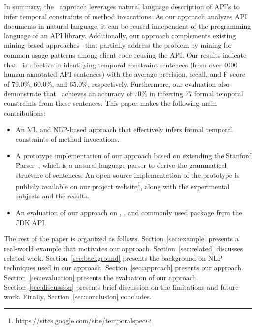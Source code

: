 In summary, the \tool\ approach leverages natural language description of API's to infer temporal constraints of method invocations.
As our approach analyzes API documents in natural language, it can be reused independent of the programming language of an API library.
Additionally, our approach complements existing mining-based approaches~\cite{buse2012synthesizing, thummalapenta07parseweb, Wang:2013:MSR, Zhong:2009:MMR} that partially address the problem by mining for common usage patterns among client code reusing the API.
Our results indicate that \tool\ is effective in identifying temporal
constraint sentences (from over
4000 human-annotated API sentences) with the average precision, recall, and F-score
of 79.0\%, 60.0\%, and 65.0\%, respectively.
Furthermore, our evaluation also demonstrate that \tool\ achieves an accuracy of 70\% in inferring 77 formal temporal constraints from these sentences.
This paper makes the following main contributions:


\begin{itemize}
	\item An ML and NLP-based approach that effectively infers formal temporal constraints of method invocations. 
	\item A prototype implementation of our approach based on extending the Stanford Parser~\cite{Klein03}, which is a natural language parser to derive the grammatical structure of sentences.
	An open source implementation of the prototype is publicly available on our project website\footnote{\url{https://sites.google.com/site/temporalspec}}, along with the experimental subjects and the results. 
	\item An evaluation of our approach on \amazonAPI, \paypalAPI, and commonly used package  from the JDK API. 
\end{itemize}


The rest of the paper is organized as follows.
Section~\ref{sec:example} presents a real-world example that motivates our approach.
Section~\ref{sec:related} discusses related work.
Section~\ref{sec:background} presents the  background on NLP techniques used in our approach.
Section~\ref{sec:approach} presents our approach.
Section~\ref{sec:evaluation} presents the evaluation of our approach.
Section~\ref{sec:discussion} presents brief discussion on the limitations and future work.
Finally, Section~\ref{sec:conclusion} concludes.

